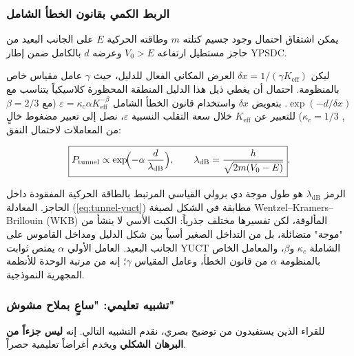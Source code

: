 \documentclass[12pt,a4paper]{article}
\theoremstyle{remark}
\begin{document}
	\subsubsection{الربط الكمي بقانون الخطأ الشامل}
	
	يمكن اشتقاق احتمال وجود جسيم كتلته \(m\) وطاقته الحركية \(E\) على الجانب البعيد من حاجز مستطيل ارتفاعه \(V_0>E\) وعرضه \(d\) بالكامل ضمن إطار YPSDC.
	
	ليكن \(\delta x = 1/(\gamma K_{\mathrm{eff}})\) العرض المكاني الفعال للدليل، حيث \(\gamma\) عامل مقياس خاص بالمنظومة. احتمال أن يغطي ذيل هذا الدليل المنطقة المحظورة كلاسيكياً يتناسب مع \(\exp(-d / \delta x)\). بتعويض \(\delta x\) واستخدام قانون الخطأ الشامل \(\varepsilon = \kappa_c \alpha K_{\mathrm{eff}}^{-\beta}\) (مع \(\beta=2/3\), \(\kappa_c=1/3\)) للتعبير عن \(K_{\mathrm{eff}}\) خلال سعة التقلب النسبية \(\varepsilon\)، نصل إلى تعبير مضغوط خالٍ من المعاملات لاحتمال النفق:
	
	\begin{equation}
		\boxed{ P_{\mathrm{tunnel}} \propto \exp\!\Bigl( -\alpha \,
			\frac{d}{\lambda_{\mathrm{dB}}} \Bigr),
			\qquad
			\lambda_{\mathrm{dB}} = \frac{h}{\sqrt{2m(V_0-E)}} }.
		\label{eq:tunnel-yuct}
	\end{equation}
	
	الرمز \(\lambda_{\mathrm{dB}}\) هو طول موجة دي برولي القياسي المرتبط بالطاقة الحركية المفقودة داخل الحاجز. المعادلة (\ref{eq:tunnel-yuct}) مطابقة في الشكل لصيغة Wentzel–Kramers–Brillouin (WKB) المألوفة، لكن تفسيرها مختلف جذرياً: الكبت الأسي لا ينشأ من "موجة" متضائلة، بل من التداخل الصغير أسياً بين شكل الدليل ومداخل القاموس على الجانب البعيد. العامل الأولي \(\alpha\) يمتص ثوابت YUCT الشاملة \(\kappa_c\) و\(\beta\)، والمعامل الخاص بالمنظومة \(\alpha\) من قانون الخطأ، وعامل المقياس \(\gamma\)؛ إنه من مرتبة الوحدة للأنظمة المجهرية النموذجية.
	
	\subsubsection{تشبيه تعليمي: "ساعٍ بملاح مشوش"}
	
	للقراء الذين يستفيدون من توضيح بصري، نقدم التشبيه التالي. إنه \textbf{ليس جزءاً من البرهان الشكلي} ويخدم أغراضاً تعليمية حصراً.
	
	\medskip
	\medskip
	
\end{document}
